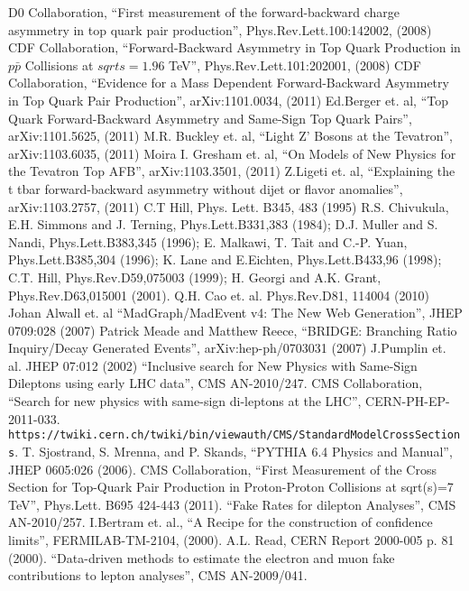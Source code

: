 \begin{thebibliography}{99}

 {D0 Collaboration, ``First measurement of the forward-backward charge asymmetry in top quark pair production'', Phys.Rev.Lett.100:142002, (2008)}
 {CDF Collaboration, ``Forward-Backward Asymmetry in Top Quark Production in $p\bar{p}$ Collisions at $sqrt{s}=1.96$ TeV'', Phys.Rev.Lett.101:202001, (2008)}
 {CDF Collaboration, ``Evidence for a Mass Dependent Forward-Backward Asymmetry in Top Quark Pair Production'', arXiv:1101.0034, (2011)}
 {Ed.Berger et. al, ``Top Quark Forward-Backward Asymmetry and Same-Sign Top Quark Pairs'', arXiv:1101.5625, (2011)}
 {M.R. Buckley et. al, ``Light Z' Bosons at the Tevatron'', arXiv:1103.6035, (2011)}
 {Moira I. Gresham et. al, ``On Models of New Physics for the Tevatron Top AFB'', arXiv:1103.3501, (2011)}
 {Z.Ligeti et. al, ``Explaining the t tbar forward-backward asymmetry without dijet or flavor anomalies'', arXiv:1103.2757, (2011)}
 {C.T Hill, Phys. Lett. B345, 483 (1995)}
 {R.S. Chivukula, E.H. Simmons and J. Terning, Phys.Lett.B331,383 (1984); D.J. Muller and S. Nandi, Phys.Lett.B383,345 (1996); E. Malkawi, T. Tait 
and C.-P. Yuan, Phys.Lett.B385,304 (1996); K. Lane and E.Eichten, Phys.Lett.B433,96 (1998); C.T. Hill, Phys.Rev.D59,075003 (1999); H. Georgi and A.K. Grant, 
Phys.Rev.D63,015001 (2001).}
 {Q.H. Cao et. al. Phys.Rev.D81, 114004 (2010)}
 {Johan Alwall et. al ``MadGraph/MadEvent v4: The New Web Generation'', JHEP 0709:028 (2007)}
 {Patrick Meade and Matthew Reece, ``BRIDGE: Branching Ratio Inquiry/Decay Generated Events'', 	arXiv:hep-ph/0703031 (2007)}
 {J.Pumplin et. al. JHEP 07:012 (2002)}
 {``Inclusive search for New Physics with Same-Sign Dileptons using early LHC data''}, CMS AN-2010/247.
 {CMS Collaboration, ``Search for new physics with same-sign di-leptons at the LHC''}, CERN-PH-EP-2011-033.
 {\tt https://twiki.cern.ch/twiki/bin/viewauth/CMS/StandardModelCrossSections}.
 {T. Sjostrand, S. Mrenna, and P. Skands, ``PYTHIA 6.4 Physics and Manual'', JHEP 0605:026 (2006)}.
 {CMS Collaboration, ``First Measurement of the Cross Section for Top-Quark Pair Production in Proton-Proton Collisions at 
sqrt(s)=7 TeV'', Phys.Lett. B695 424-443 (2011)}.
 {``Fake Rates for dilepton Analyses''}, CMS AN-2010/257.
 {I.Bertram et. al., ``A Recipe for the construction of confidence limits'', FERMILAB-TM-2104, (2000).}
 {A.L. Read, CERN Report 2000-005 p. 81 (2000).}
 {``Data-driven methods to estimate the electron and muon fake contributions to lepton analyses''}, CMS AN-2009/041.

\end{thebibliography}
